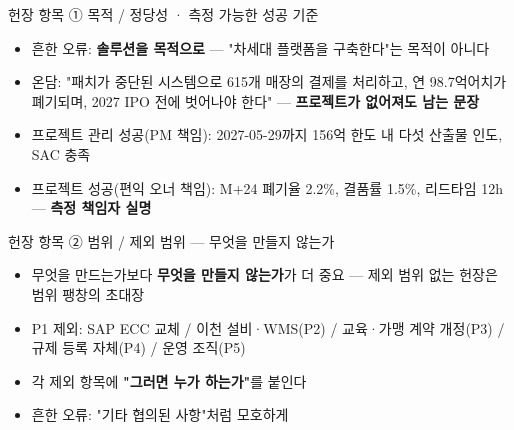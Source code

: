 \begin{frame}{헌장 항목 ① 목적 / 정당성 · 측정 가능한 성공 기준}
\begin{itemize}
\item 흔한 오류: \textbf{솔루션을 목적으로} — "차세대 플랫폼을 구축한다"는 목적이 아니다
\item 온담: "패치가 중단된 시스템으로 615개 매장의 결제를 처리하고, 연 98.7억어치가 폐기되며, 2027 IPO 전에 벗어나야 한다" — \textbf{프로젝트가 없어져도 남는 문장}
\end{itemize}
\begin{itemize}
\item 프로젝트 관리 성공(PM 책임): 2027-05-29까지 156억 한도 내 다섯 산출물 인도, SAC 충족
\item 프로젝트 성공(편익 오너 책임): M+24 폐기율 2.2\%, 결품률 1.5\%, 리드타임 12h — \textbf{측정 책임자 실명}
\end{itemize}
\end{frame}

\begin{frame}{헌장 항목 ② 범위 / 제외 범위 — 무엇을 만들지 않는가}
\begin{itemize}
\item 무엇을 만드는가보다 \textbf{무엇을 만들지 않는가}가 더 중요 — 제외 범위 없는 헌장은 범위 팽창의 초대장
\item P1 제외: SAP ECC 교체 / 이천 설비·WMS(P2) / 교육·가맹 계약 개정(P3) / 규제 등록 자체(P4) / 운영 조직(P5)
\item 각 제외 항목에 \textbf{"그러면 누가 하는가"}를 붙인다
\item 흔한 오류: "기타 협의된 사항"처럼 모호하게
\end{itemize}
\end{frame}

